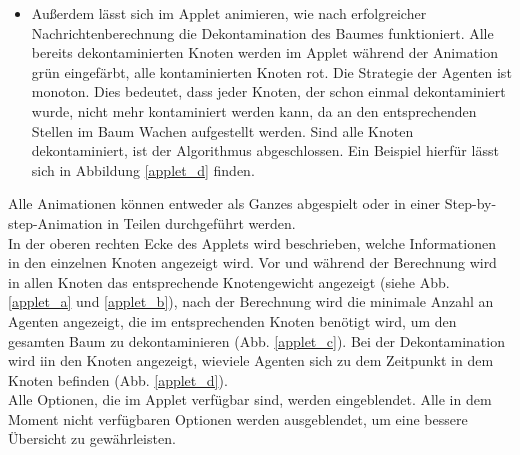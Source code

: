 \begin{itemize}
	\item Außerdem lässt sich im Applet animieren, wie nach erfolgreicher Nachrichtenberechnung die Dekontamination des Baumes funktioniert. Alle bereits dekontaminierten Knoten werden im Applet während der Animation grün eingefärbt, alle kontaminierten Knoten rot. Die Strategie der Agenten ist  monoton. Dies bedeutet, dass jeder Knoten, der schon einmal dekontaminiert wurde, nicht mehr kontaminiert werden kann, da an den entsprechenden Stellen im Baum Wachen aufgestellt werden. Sind alle Knoten dekontaminiert, ist der Algorithmus abgeschlossen. Ein Beispiel hierfür lässt sich in Abbildung \ref{applet_d} finden.
\end{itemize}

Alle Animationen können entweder als Ganzes abgespielt oder in einer Step-by-step-Animation in Teilen durchgeführt werden. \\
In der oberen rechten Ecke des Applets wird beschrieben, welche Informationen in den einzelnen Knoten angezeigt wird. Vor und während der Berechnung wird in allen Knoten das entsprechende Knotengewicht angezeigt (siehe Abb. \ref{applet_a} und \ref{applet_b}), nach der Berechnung wird die minimale Anzahl an Agenten angezeigt, die im entsprechenden Knoten benötigt wird, um den gesamten Baum zu dekontaminieren (Abb. \ref{applet_c}). Bei der Dekontamination wird iin den Knoten angezeigt, wieviele Agenten sich zu dem Zeitpunkt in dem Knoten befinden (Abb. \ref{applet_d}).\\
Alle Optionen, die im Applet verfügbar sind, werden eingeblendet. Alle in dem Moment nicht verfügbaren Optionen werden ausgeblendet, um eine bessere Übersicht zu gewährleisten.


